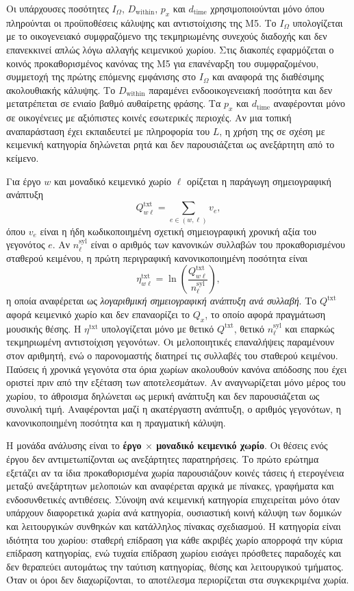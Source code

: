 \documentclass[11pt,a4paper]{article}
\begin{document}
Οι υπάρχουσες ποσότητες $I_{\Omega}$, $D_{\mathrm{within}}$, $p_x$ και $d_{\mathrm{time}}$ χρησιμοποιούνται μόνο όπου πληρούνται οι προϋποθέσεις κάλυψης και αντιστοίχισης της M5. Το $I_{\Omega}$ υπολογίζεται με το οικογενειακό συμφραζόμενο της τεκμηριωμένης συνεχούς διαδοχής και δεν επανεκκινεί απλώς λόγω αλλαγής κειμενικού χωρίου. Στις διακοπές εφαρμόζεται ο κοινός προκαθορισμένος κανόνας της M5 για επανέναρξη του συμφραζομένου, συμμετοχή της πρώτης επόμενης εμφάνισης στο $I_{\Omega}$ και αναφορά της διαθέσιμης ακολουθιακής κάλυψης. Το $D_{\mathrm{within}}$ παραμένει ενδοοικογενειακή ποσότητα και δεν μετατρέπεται σε ενιαίο βαθμό αυθαίρετης φράσης. Τα $p_x$ και $d_{\mathrm{time}}$ αναφέρονται μόνο σε οικογένειες με αξιόπιστες κοινές εσωτερικές περιοχές. Αν μια τοπική αναπαράσταση έχει εκπαιδευτεί με πληροφορία του $L$, η χρήση της σε σχέση με κειμενική κατηγορία δηλώνεται ρητά και δεν παρουσιάζεται ως ανεξάρτητη από το κείμενο.

Για έργο $w$ και μοναδικό κειμενικό χωρίο $\ell$ ορίζεται η παράγωγη σημειογραφική ανάπτυξη
\[
Q^{\mathrm{txt}}_{w\ell}=\sum_{e\in(w,\ell)} v_e,
\]
όπου $v_e$ είναι η ήδη κωδικοποιημένη σχετική σημειογραφική χρονική αξία του γεγονότος $e$. Αν $n^{\mathrm{syl}}_{\ell}$ είναι ο αριθμός των κανονικών συλλαβών του προκαθορισμένου σταθερού κειμένου, η πρώτη περιγραφική κανονικοποιημένη ποσότητα είναι
\[
\eta^{\mathrm{txt}}_{w\ell}=\ln\!\left(\frac{Q^{\mathrm{txt}}_{w\ell}}{n^{\mathrm{syl}}_{\ell}}\right),
\]
η οποία αναφέρεται ως \emph{λογαριθμική σημειογραφική ανάπτυξη ανά συλλαβή}. Το $Q^{\mathrm{txt}}$ αφορά κειμενικό χωρίο και δεν επαναορίζει το $Q_x$, το οποίο αφορά πραγμάτωση μουσικής θέσης. Η $\eta^{\mathrm{txt}}$ υπολογίζεται μόνο με θετικό $Q^{\mathrm{txt}}$, θετικό $n^{\mathrm{syl}}_{\ell}$ και επαρκώς τεκμηριωμένη αντιστοίχιση γεγονότων. Οι μελοποιητικές επαναλήψεις παραμένουν στον αριθμητή, ενώ ο παρονομαστής διατηρεί τις συλλαβές του σταθερού κειμένου. Παύσεις ή χρονικά γεγονότα στα όρια χωρίων ακολουθούν κανόνα απόδοσης που έχει οριστεί πριν από την εξέταση των αποτελεσμάτων. Αν αναγνωρίζεται μόνο μέρος του χωρίου, το άθροισμα δηλώνεται ως μερική ανάπτυξη και δεν παρουσιάζεται ως συνολική τιμή. Αναφέρονται μαζί η ακατέργαστη ανάπτυξη, ο αριθμός γεγονότων, η κανονικοποιημένη ποσότητα και η πραγματική κάλυψη.

Η μονάδα ανάλυσης είναι το \textbf{έργο $\times$ μοναδικό κειμενικό χωρίο}. Οι θέσεις ενός έργου δεν αντιμετωπίζονται ως ανεξάρτητες παρατηρήσεις. Το πρώτο ερώτημα εξετάζει αν τα ίδια προκαθορισμένα χωρία παρουσιάζουν κοινές τάσεις ή ετερογένεια μεταξύ ανεξάρτητων μελοποιών και αναφέρεται αρχικά με πίνακες, γραφήματα και ενδοσυνθετικές αντιθέσεις. Σύνοψη ανά κειμενική κατηγορία επιχειρείται μόνο όταν υπάρχουν διαφορετικά χωρία ανά κατηγορία, ουσιαστική κοινή κάλυψη των δομικών και λειτουργικών συνθηκών και κατάλληλος πίνακας σχεδιασμού. Η κατηγορία είναι ιδιότητα του χωρίου: σταθερή επίδραση για κάθε ακριβές χωρίο απορροφά την κύρια επίδραση κατηγορίας, ενώ τυχαία επίδραση χωρίου εισάγει πρόσθετες παραδοχές και δεν θεραπεύει αυτομάτως την ταύτιση κατηγορίας, θέσης και λειτουργικού τμήματος. Όταν οι όροι δεν διαχωρίζονται, το αποτέλεσμα περιορίζεται στα συγκεκριμένα χωρία.
\end{document}
